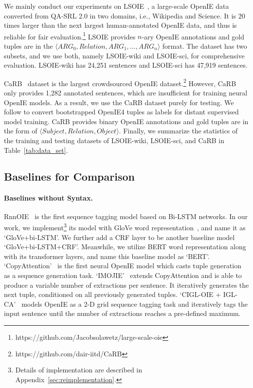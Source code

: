 \documentclass[11pt]{article}
\begin{document}
We mainly conduct our experiments on LSOIE~\cite{solawetz-larson-2021-lsoie}, a large-scale OpenIE data converted from QA-SRL 2.0 in two domains, i.e., Wikipedia and Science. It is 20 times larger than the next largest human-annotated OpenIE data, and thus is reliable for fair evaluation.\footnote{https://github.com/Jacobsolawetz/large-scale-oie}
LSOIE provides $n$-ary OpenIE annotations and gold tuples are in the $\langle ARG_0, Relation, ARG_1, \dots, ARG_n \rangle$ format.
The dataset has two subsets, and we use both, namely LSOIE-wiki and LSOIE-sci, for comprehensive evaluation. LSOIE-wiki has 24,251 sentences and LSOIE-sci has 47,919 sentences.

CaRB~\cite{bhardwaj2019carb} dataset is the largest crowdsourced OpenIE dataset.\footnote{https://github.com/dair-iitd/CaRB} 
However, CaRB only provides 1,282 annotated sentences, which are insufficient for training neural OpenIE models.
As a result, we use the CaRB dataset purely for testing. We follow \citet{kolluru2020openie6} to convert bootstrapped OpenIE4 tuples as labels for distant supervised model training.
CaRB provides binary OpenIE annotations and gold tuples are in the form of $\langle Subject, Relation, Object \rangle$.
Finally, we summarize the statistics of the training and testing datasets of LSOIE-wiki, LSOIE-sci, and CaRB in Table~\ref{tab:data_set}.


\subsection{Baselines for Comparison}
\paragraph{Baselines without Syntax.} RnnOIE~\cite{stanovsky2018supervised} is the first sequence tagging model based on Bi-LSTM networks. In our work, we implement\footnote{Details of implementation are described in Appendix~\ref{sec:reimplementation}.} its model with GloVe word representation~\cite{pennington-etal-2014-glove}, and name it as `GloVe+bi-LSTM'. We further add a CRF layer to be another baseline model `GloVe+bi-LSTM+CRF'. Meanwhile, we utilize BERT word representation along with its transformer layers, and name this baseline model as `BERT'. `CopyAttention'~\cite{cui2018neural} is the first neural OpenIE model which casts tuple generation as a sequence generation task. `IMOJIE'~\cite{kolluru2020imojie} extends CopyAttention and is able to produce a variable number of extractions per sentence. It iteratively generates the next tuple, conditioned on all previously generated tuples. `CIGL-OIE + IGL-CA'~\cite{kolluru2020openie6} models OpenIE as a 2-D grid sequence tagging task and iteratively tags the input sentence until the number of extractions reaches a pre-defined maximum.
\end{document}
